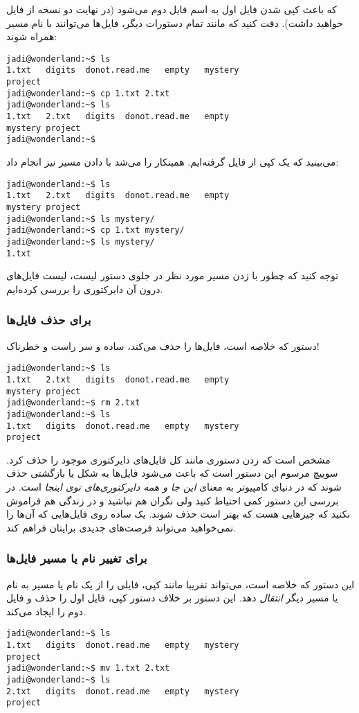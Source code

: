 که باعث کپی شدن فایل اول به اسم فایل دوم می‌شود (در نهایت دو نسخه از فایل خواهید داشت). دقت کنید که مانند تمام دستورات دیگر، فایل‌ها می‌توانند با نام مسیر همراه شوند:
\begin{frameng}
\begin{lstlisting}
jadi@wonderland:~$ ls
1.txt	digits	donot.read.me	empty	mystery
project
jadi@wonderland:~$ cp 1.txt 2.txt
jadi@wonderland:~$ ls
1.txt	2.txt	digits	donot.read.me	empty
mystery	project
jadi@wonderland:~$ 
\end{lstlisting}
\end{frameng}

می‌بینید که یک کپی از فایل  گرفته‌ایم. همینکار را می‌شد با دادن مسیر نیز انجام داد:
\begin{frameng}
\begin{lstlisting}
jadi@wonderland:~$ ls
1.txt	2.txt	digits	donot.read.me	empty
mystery	project
jadi@wonderland:~$ ls mystery/
jadi@wonderland:~$ cp 1.txt mystery/
jadi@wonderland:~$ ls mystery/
1.txt
\end{lstlisting}
\end{frameng}
توجه کنید که چطور با زدن مسیر مورد نظر در جلوی دستور لیست، لیست فایل‌های درون آن دایرکتوری را بررسی کرده‌ایم.
\subsubsection*{ برای حذف فایل‌ها}
دستور  که خلاصه 
 است، فایل‌ها را حذف می‌کند، ساده و سر راست و خطرناک!
\begin{frameng}
\begin{lstlisting}
jadi@wonderland:~$ ls
1.txt	2.txt	digits	donot.read.me	empty
mystery	project
jadi@wonderland:~$ rm 2.txt 
jadi@wonderland:~$ ls
1.txt	digits	donot.read.me	empty	mystery
project
\end{lstlisting}
\end{frameng}

مشخص است که زدن دستوری مانند
کل فایل‌های دایرکتوری موجود را حذف کرد. سوییچ مرسوم این دستور 
 است که باعث می‌شود فایل‌ها به شکل 
 یا بازگشتی حذف شوند که در دنیای کامپیوتر به معنای
\emph{این جا و همه دایرکتوری‌های توی اینجا}
است. در بررسی این دستور کمی احتیاط کنید ولی نگران هم نباشید و در زندگی هم فراموش نکنید که چیزهایی هست که بهتر است حذف شوند. یک  ساده روی فایل‌هایی که آن‌ها را نمی‌خواهید می‌تواند فرصت‌های جدیدی برایتان فراهم کند.
\subsubsection*{ برای تغییر نام یا مسیر فایل‌ها}
این دستور که خلاصه 
 است، می‌تواند تقریبا مانند کپی، فایلی را از یک نام یا مسیر به نام یا مسیر دیگر
\emph{انتقال}
دهد. این دستور بر خلاف دستور کپی، فایل‌ اول را حذف و فایل دوم را ایجاد می‌کند.
\begin{frameng}
\begin{lstlisting}
jadi@wonderland:~$ ls
1.txt	digits	donot.read.me	empty	mystery
project
jadi@wonderland:~$ mv 1.txt 2.txt
jadi@wonderland:~$ ls
2.txt	digits	donot.read.me	empty	mystery
project
\end{lstlisting}
\end{frameng}


